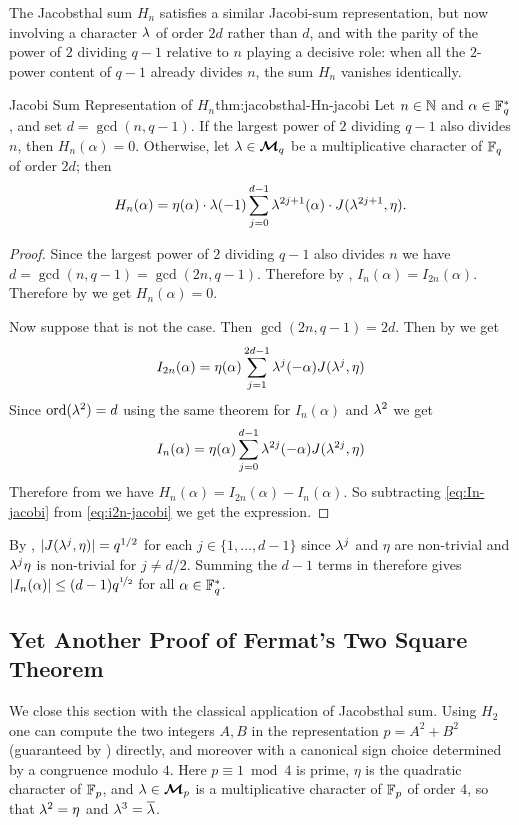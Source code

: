 The Jacobsthal sum $H_n$ satisfies a similar Jacobi-sum representation, but now involving a character $\lambda$ of order $2d$ rather than $d$, and with the parity of the power of $2$ dividing $q-1$ relative to $n$ playing a decisive role: when all the $2$-power content of $q-1$ already divides $n$, the sum $H_n$ vanishes identically.
\begin{lemma}{Jacobi Sum Representation of $H_n$}{thm:jacobsthal-Hn-jacobi}
  Let $n\in\mathbb{N}$ and $\alpha\in\mathbb{F}_q^*$, and set $d=\gcd(n,q-1)$. If the largest power of $2$ dividing $q-1$ also divides $n$, then $H_n(\alpha)=0$. Otherwise, let $\lambda\in\boldsymbol{\mathcal{M}}_q$ be a multiplicative character of $\mathbb{F}_q$ of order $2d$; then $$H_n(\alpha)=\eta(\alpha)\cdot \lambda(-1)\sum_{j=0}^{d-1}\lambda^{2j+1}(\alpha)\cdot J(\lambda^{2j+1},\eta).$$
\end{lemma}
\begin{proof}
  Since the largest power of $2$ dividing $q-1$ also divides $n$ we have $d=\gcd(n,q-1)=\gcd(2n,q-1)$. Therefore by , $I_n(\alpha)=I_{2n}(\alpha)$. Therefore by  we get $H_n(\alpha)=0$. 

  Now suppose that is not the case. Then $\gcd(2n,q-1)=2d$. Then by  we get \begin{equation}
    I_{2n}(\alpha)=\eta(\alpha)\sum_{j=1}^{2d-1}\lambda^j(-\alpha)J(\lambda^j,\eta)\label{eq:i2n-jacobi}
  \end{equation}Since $\operatorname{ord}(\lambda^2)=d$ using the same theorem for $I_n(\alpha)$ and $\lambda^2$ we get \begin{equation}
    I_n(\alpha)=\eta(\alpha)\sum_{j=0}^{d-1}\lambda^{2j}(-\alpha)J(\lambda^{2j},\eta)\label{eq:In-jacobi}
  \end{equation}Therefore from  we have $H_n(\alpha)=I_{2n}(\alpha)-I_n(\alpha)$. So subtracting \eqref{eq:In-jacobi} from \eqref{eq:i2n-jacobi} we get the expression. 
\end{proof}
\begin{note}
  By \JacobiCompletethm, $|J(\lambda^j,\eta)|=q^{1/2}$ for each $j\in\{1,\dots,d-1\}$ since $\lambda^j$ and $\eta$ are non-trivial and $\lambda^j\eta$ is non-trivial for $j\neq d/2$. Summing the $d-1$ terms in  therefore gives $|I_n(\alpha)|\leq (d-1)q^{\nicefrac12}$ for all $\alpha\in\mathbb{F}_q^*$.
\end{note} 

\subsection{Yet Another Proof of Fermat's Two Square Theorem}\label{sec:fermat-2-square-another}
We close this section with the classical application of Jacobsthal sum. Using $H_2$ one can compute the two integers $A,B$ in the representation $p=A^2+B^2$ (guaranteed by ) directly, and moreover with a canonical sign choice determined by a congruence modulo $4$. Here $p\equiv 1\bmod 4$ is prime, $\eta$ is the quadratic character of $\mathbb{F}_p$, and $\lambda\in\boldsymbol{\mathcal{M}}_p$ is a multiplicative character of $\mathbb{F}_p$ of order $4$, so that $\lambda^2=\eta$ and $\lambda^3=\overline{\lambda}$.

